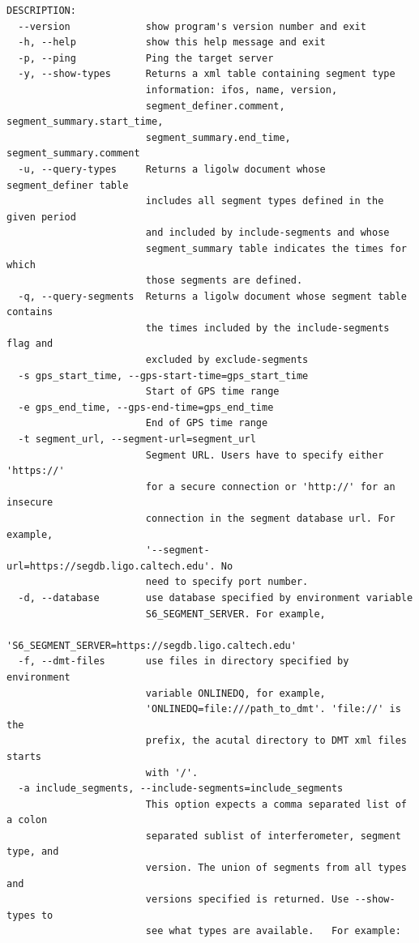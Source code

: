 {\small
\begin{verbatim}
DESCRIPTION:
  --version             show program's version number and exit
  -h, --help            show this help message and exit
  -p, --ping            Ping the target server
  -y, --show-types      Returns a xml table containing segment type
                        information: ifos, name, version,
                        segment_definer.comment, segment_summary.start_time,
                        segment_summary.end_time, segment_summary.comment
  -u, --query-types     Returns a ligolw document whose segment_definer table
                        includes all segment types defined in the given period
                        and included by include-segments and whose
                        segment_summary table indicates the times for which
                        those segments are defined.
  -q, --query-segments  Returns a ligolw document whose segment table contains
                        the times included by the include-segments flag and
                        excluded by exclude-segments
  -s gps_start_time, --gps-start-time=gps_start_time
                        Start of GPS time range
  -e gps_end_time, --gps-end-time=gps_end_time
                        End of GPS time range
  -t segment_url, --segment-url=segment_url
                        Segment URL. Users have to specify either 'https://'
                        for a secure connection or 'http://' for an insecure
                        connection in the segment database url. For example,
                        '--segment-url=https://segdb.ligo.caltech.edu'. No
                        need to specify port number.
  -d, --database        use database specified by environment variable
                        S6_SEGMENT_SERVER. For example,
                        'S6_SEGMENT_SERVER=https://segdb.ligo.caltech.edu'
  -f, --dmt-files       use files in directory specified by environment
                        variable ONLINEDQ, for example,
                        'ONLINEDQ=file:///path_to_dmt'. 'file://' is the
                        prefix, the acutal directory to DMT xml files starts
                        with '/'.
  -a include_segments, --include-segments=include_segments
                        This option expects a comma separated list of a colon
                        separated sublist of interferometer, segment type, and
                        version. The union of segments from all types and
                        versions specified is returned. Use --show-types to
                        see what types are available.   For example:

\end{verbatim}}
